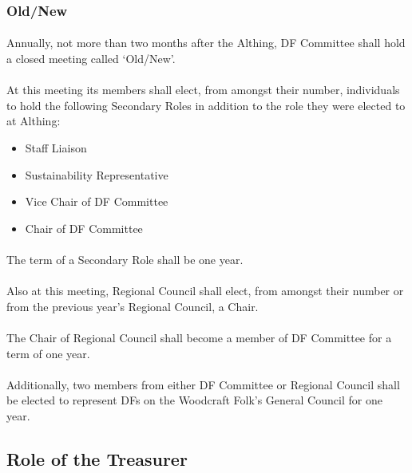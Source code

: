 \documentclass[a4paper, 12pt]{article}
\begin{document}
\subsubsection{Old/New}
\label{sec:oldnew}
\paragraph{} Annually, not more than two months after the Althing, DF Committee shall hold a closed meeting called `Old/New'.
\paragraph{} At this meeting its members shall elect, from amongst their number, individuals to hold the following Secondary Roles in addition to the role they were elected to at Althing:
\begin{itemize}
\item Staff Liaison
\item Sustainability Representative
\item Vice Chair of DF Committee
\item Chair of DF Committee
\end{itemize}

\paragraph{} The term of a Secondary Role shall be one year.

\paragraph{} \label{par:rcchair} Also at this meeting, Regional Council shall elect, from amongst their number or from the previous year's Regional Council, a Chair.

\paragraph{} The Chair of Regional Council shall become a member of DF Committee for a term of one year.

\paragraph{} Additionally, two members from either DF Committee or Regional Council shall be elected to represent DFs on the Woodcraft Folk's General Council for one year.

\subsection{Role of the Treasurer}
\label{sec:treasurerrole}
\end{document}
